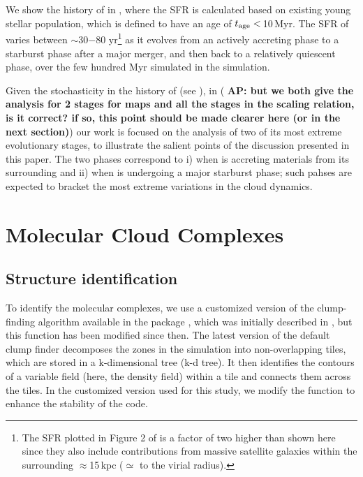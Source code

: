 \IfFileExists{emulateapjlegacy.cls}{\documentclass[iop]{emulateapjlegacy}}{\documentclass[iop]{emulateapj}}
\newcommand{\AP}[1]{({\bf \color{apcolor} AP: #1})}
\begin{document}
We show the \SF history of \flower in , where the SFR is calculated based on existing young stellar population, which is defined to have an age of $t_{\rm age}<$\,10\,Myr. The SFR of \flower varies between $\sim$30$-$80\,\Msun\,yr\pmOne\footnote{The SFR plotted in Figure 2 of \citet{Pallottini17b} is a factor of two higher than shown here since they also include contributions from massive satellite galaxies within the surrounding $\approx$15\,kpc ($\simeq$ to the virial radius).} as it evolves from an actively accreting phase to a starburst phase after a major merger, and then back to a relatively quiescent phase, over the few hundred Myr simulated in the simulation.

Given the stochasticity in the \SF history of \flower (see ), in  \AP{but we both give the analysis for 2 stages for maps and all the stages in the scaling relation, is it correct? if so, this point should be made clearer here (or in the next section)} our work is focused on the analysis of two of its most extreme evolutionary stages, to illustrate the salient points of the discussion presented in this paper. The two phases correspond to i) when \flower is accreting materials from its surrounding  and ii) when \flower is undergoing a major starburst phase; such pahses are expected to bracket the most extreme variations in the cloud dynamics. 

\section{Molecular Cloud Complexes}\label{sec:eqn}

\subsection{Structure identification}\label{sec:method}

To identify the molecular complexes, we use a customized version of the clump-finding algorithm available in the  package  \citep{Turk2011a}, which was initially described in \citet{Smith09a}, but this function has been modified since then.
%
The latest version of the default  clump finder decomposes the zones in the simulation into non-overlapping tiles, which are stored in a k-dimensional tree (k-d tree). It then identifies the contours of a variable field (here, the density field) within a tile and connects them across the tiles. In the customized version used for this study, we modify the function to enhance the stability of the code.
\end{document}
